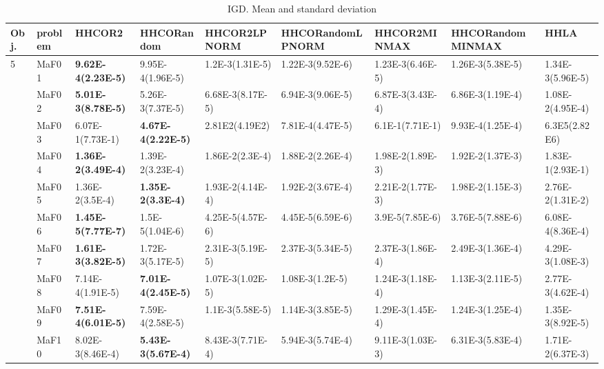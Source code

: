 \documentclass[]{article}
\begin{document}
\begin{landscape}
\begin{table}
\caption{IGD. Mean and standard deviation}
\label{table:mean.IGD}
\centering
\begin{footnotesize}
\begin{tabular}{|l|l|l|l|l|l|l|l|l|}
\hline
Obj. & problem  & HHCOR2 & HHCORandom & HHCOR2LPNORM & HHCORandomLPNORM & HHCOR2MINMAX & HHCORandomMINMAX & HHLA \\ \hline

\multirow{15}{*}{5} & MaF01 & \cellcolor{gray95} {\bf 9.62E-4(2.23E-5)} & \cellcolor{gray95} 9.95E-4(1.96E-5) & 1.2E-3(1.31E-5) & 1.22E-3(9.52E-6) & 1.23E-3(6.46E-5) & 1.26E-3(5.38E-5) & 1.34E-3(5.96E-5)\\
 & MaF02 & \cellcolor{gray95} {\bf 5.01E-3(8.78E-5)} & \cellcolor{gray95} 5.26E-3(7.37E-5) & 6.68E-3(8.17E-5) & 6.94E-3(9.06E-5) & 6.87E-3(3.43E-4) & 6.86E-3(1.19E-4) & 1.08E-2(4.95E-4)\\
 & MaF03 & 6.07E-1(7.73E-1) & \cellcolor{gray95} {\bf 4.67E-4(2.22E-5)} & 2.81E2(4.19E2) & \cellcolor{gray95} 7.81E-4(4.47E-5) & 6.1E-1(7.71E-1) & 9.93E-4(1.25E-4) & 6.3E5(2.82E6)\\
 & MaF04 & \cellcolor{gray95} {\bf 1.36E-2(3.49E-4)} & \cellcolor{gray95} 1.39E-2(3.23E-4) & 1.86E-2(2.3E-4) & 1.88E-2(2.26E-4) & 1.98E-2(1.89E-3) & 1.92E-2(1.37E-3) & 1.83E-1(2.93E-1)\\
 & MaF05 & \cellcolor{gray95} 1.36E-2(3.5E-4) & \cellcolor{gray95} {\bf 1.35E-2(3.3E-4)} & 1.93E-2(4.14E-4) & 1.92E-2(3.67E-4) & 2.21E-2(1.77E-3) & 1.98E-2(1.15E-3) & 2.76E-2(1.31E-2)\\
 & MaF06 & \cellcolor{gray95} {\bf 1.45E-5(7.77E-7)} & \cellcolor{gray95} 1.5E-5(1.04E-6) & 4.25E-5(4.57E-6) & 4.45E-5(6.59E-6) & 3.9E-5(7.85E-6) & 3.76E-5(7.88E-6) & 6.08E-4(8.36E-4)\\
 & MaF07 & \cellcolor{gray95} {\bf 1.61E-3(3.82E-5)} & \cellcolor{gray95} 1.72E-3(5.17E-5) & 2.31E-3(5.19E-5) & 2.37E-3(5.34E-5) & 2.37E-3(1.86E-4) & 2.49E-3(1.36E-4) & 4.29E-3(1.08E-3)\\
 & MaF08 & \cellcolor{gray95} 7.14E-4(1.91E-5) & \cellcolor{gray95} {\bf 7.01E-4(2.45E-5)} & 1.07E-3(1.02E-5) & 1.08E-3(1.2E-5) & 1.24E-3(1.18E-4) & 1.13E-3(2.11E-5) & 2.77E-3(4.62E-4)\\
 & MaF09 & \cellcolor{gray95} {\bf 7.51E-4(6.01E-5)} & \cellcolor{gray95} 7.59E-4(2.58E-5) & 1.1E-3(5.58E-5) & 1.14E-3(3.85E-5) & 1.29E-3(1.45E-4) & 1.24E-3(1.25E-4) & 1.35E-3(8.92E-5)\\
 & MaF10 & 8.02E-3(8.46E-4) & \cellcolor{gray95} {\bf 5.43E-3(5.67E-4)} & 8.43E-3(7.71E-4) & \cellcolor{gray95} 5.94E-3(5.74E-4) & 9.11E-3(1.03E-3) & \cellcolor{gray95} 6.31E-3(5.83E-4) & 1.71E-2(6.37E-3)\\

\end{tabular}
\end{footnotesize}
\end{table}
\end{landscape}
\end{document}
